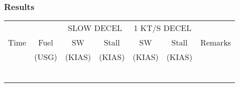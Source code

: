 % 
% 
%
\Large
\subsubsection*{Results}
  \begin{tabularx}{\textwidth}{|c|c||c|c||c|c||X|}
    \hline
    &&\multicolumn{2}{c||}{SLOW DECEL}&\multicolumn{2}{c||}{1 KT/S DECEL}&\\
    \cline{3-6}
    Time&Fuel&SW&Stall&SW&Stall& Remarks\\
    &(USG)&(KIAS)&(KIAS)&(KIAS)&(KIAS)&\\
    \hline
    \hline
    &&&&&&\\
    \hline
    &&&&&&\\
    \hline
    &&&&&&\\
    \hline
    &&&&&&\\
    \hline
    &&&&&&\\
    \hline
    &&&&&&\\
    \hline
    \end{tabularx}     
    \normalsize

   